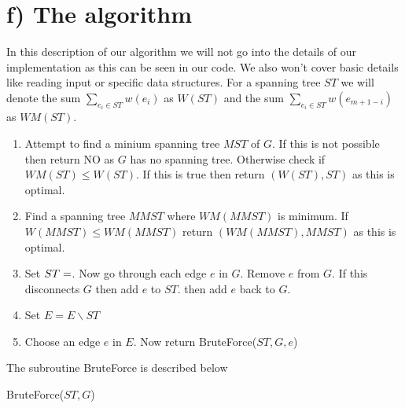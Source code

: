 \section*{f) The algorithm}

In this description of our algorithm we will not go into the details of our implementation as this can be seen in our code. We also won't cover basic details like reading input or specific data structures. For a spanning tree $ST$ we will denote the sum $\sum_{e_i \in ST} w(e_i) $ as $W(ST)$ and the sum $\sum_{e_i\in ST}w(e_{m+1-i})$ as $WM(ST)$. 

\begin{enumerate}
    \item Attempt to find a minium spanning tree $MST$ of $G$. If this is not possible then return NO as $G$ has no spanning tree. Otherwise check if $WM(ST) \leq W(ST)$. If this is true then return $(W(ST),ST)$ as this is optimal.
    \item Find a spanning tree $MMST$ where $WM(MMST)$ is minimum. If $W(MMST) \leq WM(MMST)$ return $(WM(MMST),MMST)$ as this is optimal.
    \item Set $ST = \empty$. Now go through each edge $e$ in $G$. Remove $e$ from $G$. If this disconnects $G$ then add $e$ to $ST$. then add $e$ back to $G$.
    \item Set $E = E \backslash ST$
    \item Choose an edge $e$ in $E$. Now return BruteForce($ST,G,e$)
\end{enumerate}

The subroutine BruteForce is described below

\begin{algorithm}[H]
\caption{BruteForce($ST,G$)}\label{alg:bruteforce}
\begin{algorithmic}

\State 

\end{algorithmic}
\end{algorithm}

